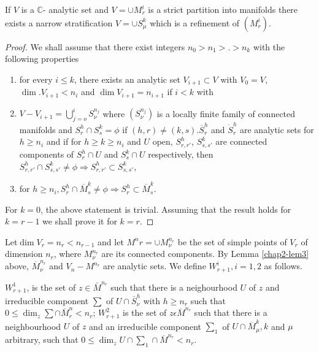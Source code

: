 \begin{proposition}\label{chap2-prop2} %
  If $V$ is a $\mathbb{C}$- analytic set and $V = \cup M^{i}_{r}$ is a
  strict partition into manifolds there exists a narrow stratification
  $V = \cup S^{k}_{\mu}$ which is a refinement of $(M^{i}_{r})$.   
\end{proposition}

\begin{proof} %
  We shall assume that there exist integers $n_{0} > n_{1} > . >n_{k}$
  with the following properties 
  \begin{enumerate}[(1)]
  \item for every $i\le k$, there exists an analytic set $V_{i+1}
    \subset V $ with $V_{0} = V$, $\dim. V_{i+1} < n_{i}$ and $\dim
    V_{i+1} = n_{i+1}$ if $i < k$ with  

  \item $V - V_{i+1} = \bigcup \limits _{j=o}^{i}  S^{n_{j}}_{\nu}$
    where $(S^{n_{j}}_{\nu})$ is a locally finite family of connected
    manifolds and $ S^{h}_{r} \cap S^{k}_{s} = \phi $ if $(h,r) \neq
    (k,s).\overline{S}^{h}_{r}$ and  $\dot{S}^{h}_{r}$ are analytic sets for
    $h \ge n_{i}$ and if for 
    $h\ge k\ge n_{i}$ and $U$ open, $S^{h}_{r,r'}$, $S^{k}_{s,s'}$ are
    connected components of $S^{h}_{r} \cap U$ and $S^{k}_{s} \cap U$
    respectively, then $S^{h}_{r,r'} \cap S^{k}_{s,s'} \neq \phi
    \Rightarrow S^{h}_{r,r'} \subset S^{k}_{s,s'}$,
 
  \item for $h \ge n_{i}, S^{h}_{r} \cap \overline{M}^{k}_{s} \neq \phi
    \Rightarrow S^{h}_{r} \subset \overline{M}^{k}_{s}$. 
  \end{enumerate}
  For $k = 0$, the above statement is trivial. Assuming that the result
  holds for $k = r-1$ we shall prove it for $k =r$.      
\end{proof}  

Let\pageoriginale $\dim V_r = n_r < n_{r-1}$ and let $M^n r = \cup
M^{n_r}_\nu$  be 
the set of simple points of $V_r$ of dimension $n_r$, where
$M^{n_r}_\nu$ 
are its connected components. By Lemma \ref{chap2-lem3} above,
$\overline{M}^{n_r}_\nu$  and $V_n - M^{n_r}$ are analytic sets. We
define $W^i_{r+1}, i = 1,2$ as follows. 

$W^1_{r+1}$,  is the set of $ z\in \bar{M}^{n_{r}}$ such that 
there is a neighourhood $U$ of $z$ and irreducible component $\sum$ of
$U\cap \overline{S}^h_\nu$ with $h \geq n_r$ such that $0 \leq
\dim_z \sum \cap \overline{M}^n _r < n_r$; $W^2_{r+1}$ is the set of $
z \epsilon \overline{M}^{n_r}$ such that there is a neighbourhood $U$ of
$z$ and an irreducible component $\sum_1$ of $U \cap
\overline{M}^k_\mu, k$ and $\mu$ arbitrary, such that $0 \leq \dim_z U
\cap \sum_1 \cap \overline{M}^{n_r}< n_r$.  

